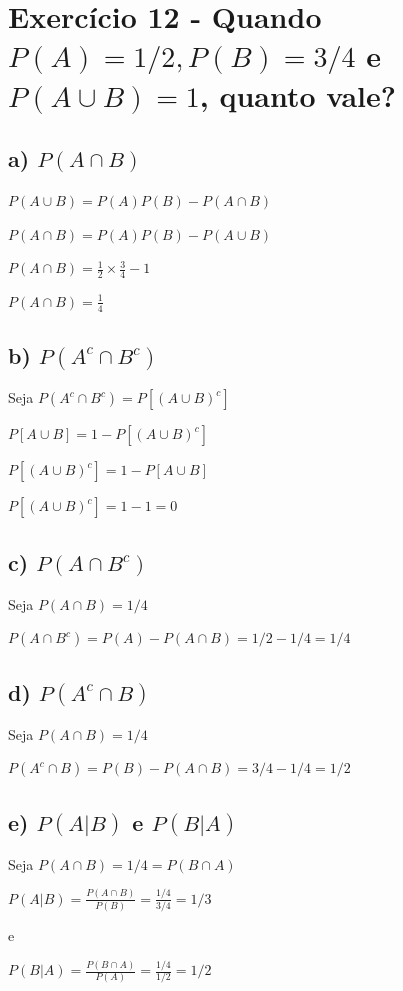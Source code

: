 \documentclass[12pt]{article}
\begin{document}
\section*{Exercício 12 - Quando $P(A)=1/2, P(B)=3/4$ e $P(A \cup B)=1$, quanto vale?}

\subsection*{a) $P(A \cap B)$}

$\displaystyle P(A \cup B)=P(A)P(B)-P(A \cap B)$

$\displaystyle P(A \cap B)=P(A)P(B)-P(A \cup B)$

$\displaystyle P(A \cap B)=\frac{1}{2} \times \frac{3}{4} - 1$

$\displaystyle P(A \cap B)=\frac{1}{4}$

\subsection*{b) $P(A^c \cap B^c)$}

Seja $P(A^c \cap B^c) = P[(A \cup B)^c]$

$\displaystyle  P[A \cup B] = 1 -  P[(A \cup B)^c]$

$\displaystyle  P[(A \cup B)^c] = 1 - P[A \cup B]$

$\displaystyle P[(A \cup B)^c] = 1 - 1 = 0$


\subsection*{c) $P(A \cap B^c)$}

Seja $P(A \cap B) = 1/4$

$P(A \cap B^c) = P(A)-P(A \cap B) = 1/2-1/4=1/4$

\subsection*{d) $P(A^c \cap B)$}

Seja $P(A \cap B) = 1/4$

$P(A^c \cap B) = P(B)-P(A \cap B) = 3/4-1/4=1/2$

\subsection*{e) $P(A | B)$ e $P(B | A)$}

Seja $P(A \cap B) = 1/4 = P(B \cap A)$

$\displaystyle P(A | B) = \frac{P(A \cap B)}{P(B)}=\frac{1/4}{3/4}=1/3$

e

$\displaystyle P(B | A) = \frac{P(B \cap A)}{P(A)}=\frac{1/4}{1/2}=1/2$










\end{document}
